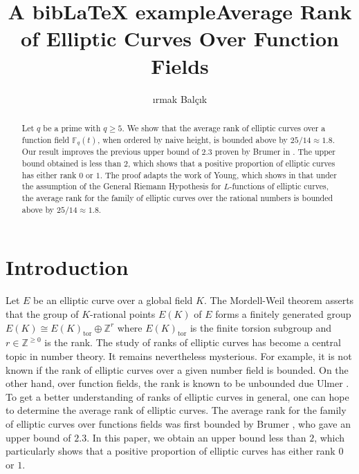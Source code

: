 \documentclass[12pt,reqno]{amsart}
\title{A bibLaTeX example}
\title{Average Rank of Elliptic Curves Over Function Fields}
\author{{\i}rmak Bal\c{c}{\i}k}
\newcommand{\BF}{\mathbb{F}}
\begin{document}
\begin{abstract}
    Let $q$ be a prime with $q \geq 5$. We show that the average rank of elliptic curves over a function field $\BF_{q}(t)$, when ordered by naive height, is bounded above by $25/14 \approx 1.8$. Our result improves the previous upper bound of $2.3$ proven by Brumer in \cite{Brumer}. The upper bound obtained is less than $2$, which shows that a positive proportion of elliptic curves has either rank $0$ or $1$. The proof adapts the work of Young, which shows in \cite{Matthew} that under the assumption of the General Riemann Hypothesis for $L$-functions of elliptic curves, the average rank for the family of elliptic curves over the rational numbers is bounded above by $ 25/14 \approx 1.8$. 
\end{abstract}

\maketitle

\section{Introduction}
Let $E$ be an elliptic curve over a global field $K$. The Mordell-Weil theorem asserts that the group of $K$-rational points $E(K)$ of $E$ forms a finitely generated group $E(K) \cong E(K)_{\text{tor}} \oplus \mathbb{Z}^{r}$ where $E(K)_{\text{tor}}$ is the finite torsion subgroup and $r \in \mathbb{Z}^{\geq 0}$ is the rank. The study of ranks of elliptic curves has become a central topic in number theory. It remains nevertheless mysterious. For example, it is not known if the rank of elliptic curves over a given number field is bounded. On the other hand, over function fields, the rank is known to be unbounded due Ulmer \cite{Ulmer-largerank}. To get a better understanding of ranks of elliptic curves in general, one can hope to determine the average rank of elliptic curves. The average rank for the family of elliptic curves over functions fields was first bounded by Brumer \cite{Brumer}, who gave an upper bound of $2.3$. In this paper, we obtain an upper bound less than $2$, which particularly shows that a positive proportion of elliptic curves has either rank $0$ or $1$. 
\end{document}
